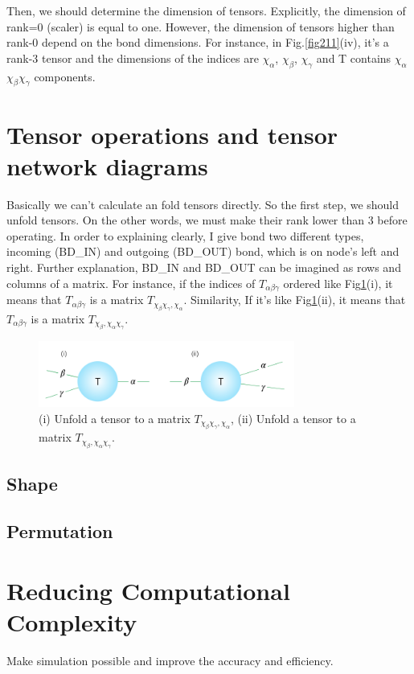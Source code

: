 	Then, we should determine the dimension of tensors. Explicitly, the dimension of rank=0 (scaler) is equal to one. However, the dimension of tensors higher than rank-0 depend on the bond dimensions. For instance, in Fig.\ref{fig211}(iv), it's a rank-3 tensor and the dimensions of the indices are $\chi_{\alpha}$, $\chi_{\beta}$, $\chi_{\gamma}$ and T contains $\chi_{\alpha}$$\chi_{\beta}$$\chi_{\gamma}$ components.

\section{Tensor operations and tensor network diagrams} %
\label{operation}
Basically we can't calculate an fold tensors directly. So the first step, we should unfold tensors. On the other words, we must make their rank lower than 3 before operating. In order to explaining clearly, I give bond two different types, incoming (BD\_IN) and outgoing (BD\_OUT) bond, which is on node's left and right. Further explanation, BD\_IN and BD\_OUT can be imagined as rows and columns of a matrix. For instance, if the indices of $T_{\alpha \beta \gamma}$ ordered like Fig\ref{fig221}(i), it means that $T_{\alpha \beta \gamma}$ is a matrix $T_{\chi_{\beta}\chi_{\gamma},\chi_{\alpha}}$. Similarity, If it's like Fig\ref{fig221}(ii), it means that $T_{\alpha \beta \gamma}$ is a matrix $T_{\chi_{\beta},\chi_{\alpha}\chi_{\gamma}}$.

	\begin{figure}[ht]
	\centering
	\includegraphics[width=0.75\textwidth]{figures/fig221.png}
	\caption[Representaion of unfold tensors.]{(i) Unfold a tensor to a matrix $T_{\chi_{\beta}\chi_{\gamma},\chi_{\alpha}}$, (ii) Unfold a tensor to a matrix $T_{\chi_{\beta},\chi_{\alpha}\chi_{\gamma}}$.}
	\label{fig221}
	\end{figure}

\subsection{Shape}

\subsection{Permutation}

\section{Reducing Computational Complexity} %
\label{sub:reduce}

Make simulation possible and improve the accuracy and efficiency.
